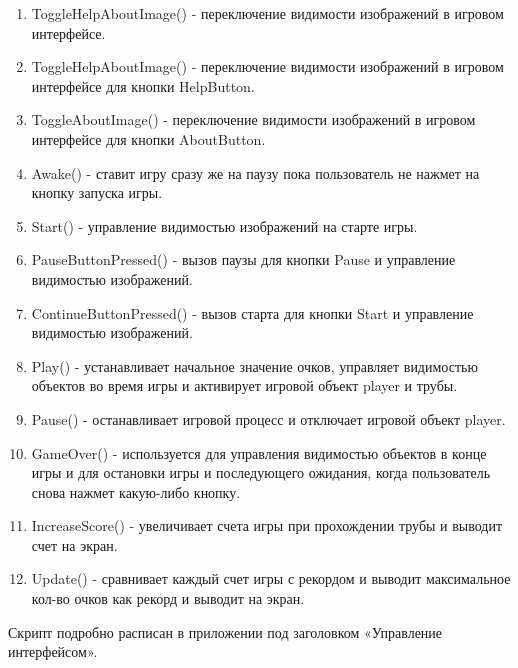 \documentclass[14pt, oneside]{altsu-report}
\begin{document}
\begin{enumerate}
\item ToggleHelpAboutImage() - переключение видимости изображений в игровом интерфейсе. 
\item ToggleHelpAboutImage() - переключение видимости изображений в игровом интерфейсе для кнопки HelpButton.
\item ToggleAboutImage() - переключение видимости изображений в игровом интерфейсе для кнопки AboutButton.
\item Awake() - ставит игру сразу же на паузу пока пользователь не нажмет на кнопку запуска игры.
\item Start() - управление видимостью изображений на старте игры.
\item PauseButtonPressed() - вызов паузы для кнопки Pause и управление видимостью изображений.
\item ContinueButtonPressed() - вызов старта для кнопки Start и управление видимостью изображений.
\item Play() - устанавливает начальное значение очков, управляет видимостью объектов во время игры и активирует игровой объект player и трубы.
\item Pause() - останавливает игровой процесс и отключает игровой объект player.
\item GameOver() - используется для управления видимостью объектов в конце игры и для остановки игры и последующего ожидания, когда пользователь снова нажмет какую-либо кнопку.
\item IncreaseScore() - увеличивает счета игры при прохождении трубы и выводит счет на экран.
\item Update() - сравнивает каждый счет игры с рекордом и выводит максимальное кол-во очков как рекорд и выводит на экран.
\end{enumerate} 

Скрипт подробно расписан в приложении под заголовком «Управление интерфейсом».
\end{document}

